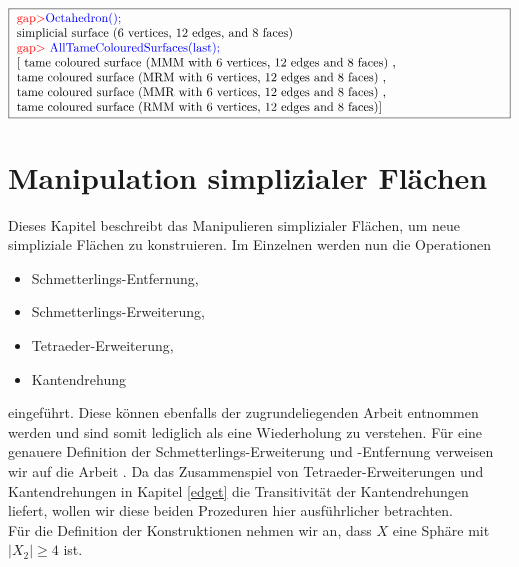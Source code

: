 \documentclass[12pt,titlepage,twoside,cleardoublepage]{article}
\theoremstyle{nummermitklammern}
\numberwithin{equation}{section}
\begin{document}
\begin{center}
$\fbox{
\parbox{14cm}{
\textcolor{red}{gap$>$}\textcolor{blue}{Octahedron();}\newline
simplicial surface (6 vertices, 12 edges, and 8 faces)\newline
\textcolor{red}{gap$>$} \textcolor{blue}{AllTameColouredSurfaces(last);}\newline
[ tame coloured surface (MMM with 6 vertices, 12 edges and 8 faces)
    , \newline
     tame coloured surface (MRM with 6 vertices, 12 edges and 8 faces)
    ,\newline
     tame coloured surface (MMR with 6 vertices, 12 edges and 8 faces)
    ,\newline
  tame coloured surface (RMM with 6 vertices, 12 edges and 8 faces)]
}}
$
\end{center}
\newpage
\section{Manipulation simplizialer Flächen}\label{manipulation}
Dieses Kapitel beschreibt das Manipulieren simplizialer Flächen, um neue simpliziale Flächen zu konstruieren. Im Einzelnen werden nun die Operationen
\begin{itemize}
\item Schmetterlings-Entfernung,
 \item Schmetterlings-Erweiterung,
 \item Tetraeder-Erweiterung,
\item Kantendrehung
\end{itemize}
 eingeführt.
Diese können ebenfalls der zugrundeliegenden Arbeit entnommen werden und sind somit lediglich als eine Wiederholung zu verstehen. Für eine genauere Definition der Schmetterlings-Erweiterung und -Entfernung verweisen wir auf die Arbeit \cite{simp}. Da das Zusammenspiel von Tetraeder-Erweiterungen und Kantendrehungen in Kapitel \ref{edget} die Transitivität der Kantendrehungen liefert, wollen wir diese beiden Prozeduren hier ausführlicher betrachten. 
\\

 Für die Definition der Konstruktionen nehmen wir an, dass $X$ eine Sphäre mit $\vert X_2 \vert \geq 4$ ist.

\end{document}

